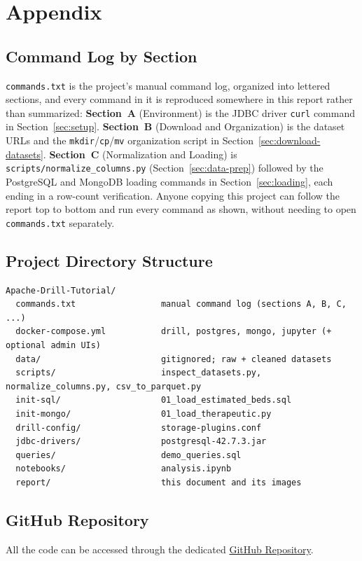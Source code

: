 \documentclass[11pt,a4paper]{article}
\begin{document}
\section{Appendix}
\label{app:extra}

\subsection{Command Log by Section}
\texttt{commands.txt} is the project's manual command log, organized into lettered
sections, and every command in it is reproduced somewhere in this report rather than
summarized: \textbf{Section~A} (Environment) is the JDBC driver
\texttt{curl} command in Section~\ref{sec:setup}. \textbf{Section~B} (Download and
Organization) is the dataset URLs and the \texttt{mkdir}/\texttt{cp}/\texttt{mv}
organization script in Section~\ref{sec:download-datasets}. \textbf{Section~C}
(Normalization and Loading) is \texttt{scripts/normalize\_columns.py}
(Section~\ref{sec:data-prep}) followed by the PostgreSQL and MongoDB loading commands
in Section~\ref{sec:loading}, each ending in a row-count verification. Anyone copying
this project can follow the report top to bottom and run every command as shown,
without needing to open \texttt{commands.txt} separately.

\subsection{Project Directory Structure}
\begin{lstlisting}[style=bashstyle]
Apache-Drill-Tutorial/
  commands.txt                 manual command log (sections A, B, C, ...)
  docker-compose.yml           drill, postgres, mongo, jupyter (+ optional admin UIs)
  data/                        gitignored; raw + cleaned datasets
  scripts/                     inspect_datasets.py, normalize_columns.py, csv_to_parquet.py
  init-sql/                    01_load_estimated_beds.sql
  init-mongo/                  01_load_therapeutic.py
  drill-config/                storage-plugins.conf
  jdbc-drivers/                postgresql-42.7.3.jar
  queries/                     demo_queries.sql
  notebooks/                   analysis.ipynb
  report/                      this document and its images
\end{lstlisting}
\subsection{GitHub Repository}
All the code can be accessed through the dedicated \href{https://github.com/DomenicoVillari3/Apache-Drill-Tutorial}{GitHub Repository}.
\end{document}
